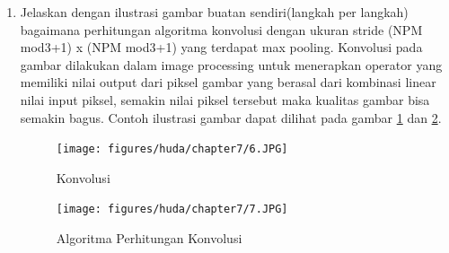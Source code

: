 \begin{enumerate}
\begin{itemize}
\end{itemize}
\item Jelaskan dengan ilustrasi gambar buatan sendiri(langkah per langkah) bagaimana perhitungan algoritma konvolusi dengan ukuran stride (NPM mod3+1) x (NPM mod3+1) yang terdapat max pooling.
\subitem Konvolusi pada gambar dilakukan dalam image processing untuk menerapkan operator yang memiliki nilai output dari piksel gambar yang berasal dari kombinasi linear nilai input piksel, semakin nilai piksel tersebut maka kualitas gambar bisa semakin bagus. Contoh ilustrasi gambar dapat dilihat pada gambar \ref{c7_6} dan \ref{c7_7}.
\begin{figure}[!htbp]
	\centerline{\texttt{[image: figures/huda/chapter7/6.JPG]}}
	\caption{Konvolusi}
	\label{c7_6}
\end{figure}
\begin{figure}[!htbp]
	\centerline{\texttt{[image: figures/huda/chapter7/7.JPG]}}
	\caption{Algoritma Perhitungan Konvolusi}
	\label{c7_7}
\end{figure}
\end{enumerate}

